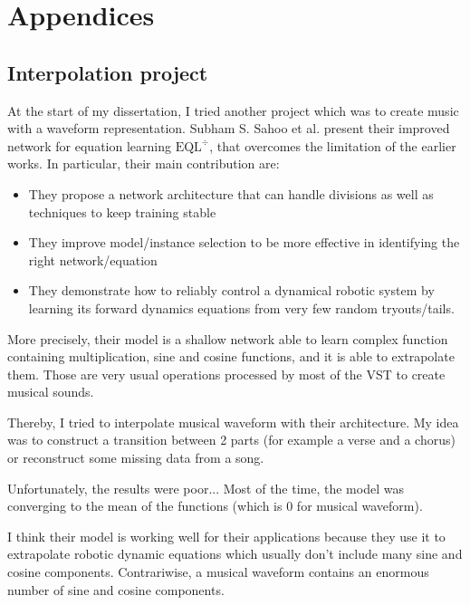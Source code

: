 \documentclass[12pt]{report}
\begin{document}
\newpage

\chapter*{Appendices}
\appendix

\section{Interpolation project}

At the start of my dissertation, I tried another project which was to create music with a waveform representation.
Subham S. Sahoo et al. \cite{sahoo_learning_2018} present their improved network for equation learning $\text{EQL}^\div$, that overcomes the limitation of the earlier works. In particular, their main contribution are:
\begin{itemize}
    \item They propose a network architecture that can handle divisions as well as techniques to keep training stable
    \item They improve model/instance selection to be more effective in identifying the right network/equation
    \item They demonstrate how to reliably control a dynamical robotic system by learning its forward dynamics equations from very few random tryouts/tails.
\end{itemize}

More precisely, their model is a shallow network able to learn complex function containing multiplication, sine and cosine functions, and it is able to extrapolate them.
Those are very usual operations processed by most of the VST to create musical sounds.

Thereby, I tried to interpolate musical waveform with their architecture.
My idea was to construct a transition between 2 parts (for example a verse and a chorus) or reconstruct some missing data from a song.

Unfortunately, the results were poor...
Most of the time, the model was converging to the mean of the functions (which is 0 for musical waveform).

I think their model is working well for their applications because they use it to extrapolate robotic dynamic equations which usually don't include many sine and cosine components.
Contrariwise, a musical waveform contains an enormous number of sine and cosine components. 
\end{document}
